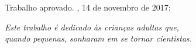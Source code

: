 \documentclass[
	12pt,				%
	openright,			%
	twoside,			%
	a4paper,			%
	english,			%
	french,				%
	spanish,			%
	brazil				%
	]{abntex2}
\begin{document}
%
% 
%
\begin{folhadeaprovacao}

  \begin{center}
    {\ABNTEXchapterfont\large\imprimirautor}

    \vspace*{\fill}\vspace*{\fill}
    \begin{center}
      \ABNTEXchapterfont\bfseries\Large\imprimirtitulo
    \end{center}
    \vspace*{\fill}
    
    \hspace{.45\textwidth}
    \begin{minipage}{.5\textwidth}
        \imprimirpreambulo
    \end{minipage}%
    \vspace*{\fill}
   \end{center}
        
   Trabalho aprovado. \imprimirlocal, 14 de novembro de 2017:

      
   \begin{center}
    \vspace*{0.5cm}
    {\large\imprimirlocal}
    \par
    {\large\imprimirdata}
    \vspace*{1cm}
  \end{center}
  
\end{folhadeaprovacao}

\begin{dedicatoria}
   \vspace*{\fill}
   \centering
   \noindent
   \textit{ Este trabalho é dedicado às crianças adultas que,\\
   quando pequenas, sonharam em se tornar cientistas.} \vspace*{\fill}
\end{dedicatoria}
\end{document}
